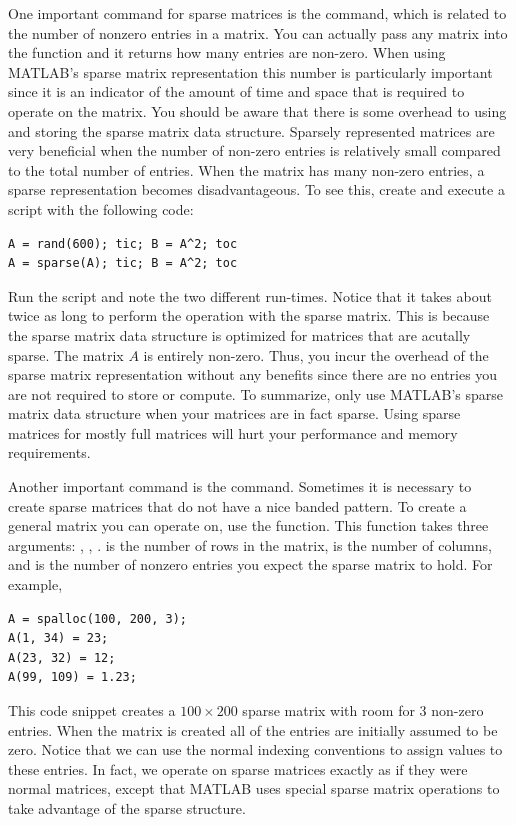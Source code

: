 One important command for sparse matrices is the  command, which is related to the number of nonzero entries in a matrix. You can actually pass any matrix into the  function and it returns how many entries are non-zero. When using MATLAB's sparse matrix representation this number is particularly important since it is an indicator of the amount of time and space that is required to operate on the matrix. You should be aware that there is some overhead to using and storing the sparse matrix data structure. Sparsely represented matrices are very beneficial when the number of non-zero entries is relatively small compared to the total number of entries. When the matrix has many non-zero entries, a sparse representation becomes disadvantageous. To see this, create and execute a script with the following code:

\begin{lstlisting}[style=matlab]
A = rand(600); tic; B = A^2; toc
A = sparse(A); tic; B = A^2; toc
\end{lstlisting}
Run the script and note the two different run-times. Notice that it takes about twice as long to perform the operation with the sparse matrix. This is because the sparse matrix data structure is optimized for matrices that are acutally sparse. The matrix $A$ is entirely non-zero. Thus, you incur the overhead of the sparse matrix representation without any benefits since there are no entries you are not required to store or compute. To summarize, only use MATLAB's sparse matrix data structure when your matrices are in fact sparse. Using sparse matrices for mostly full matrices will hurt your performance and memory requirements.

Another important command is the  command. Sometimes it is necessary to create sparse matrices that do not have a nice banded pattern. To create a general matrix you can operate on, use the  function. This function takes three arguments: , , .  is the number of rows in the matrix,  is the number of columns, and  is the number of nonzero entries you expect the sparse matrix to hold. For example,
\begin{lstlisting}[style=matlab]
A = spalloc(100, 200, 3);
A(1, 34) = 23;
A(23, 32) = 12;
A(99, 109) = 1.23;
\end{lstlisting}
This code snippet creates a $100 \times 200$ sparse matrix with room
for 3 non-zero entries. When the matrix is created all of the entries
are initially assumed to be zero. Notice that we can use the normal
indexing conventions to assign values to these entries. In fact, we
operate on sparse matrices exactly as if they were normal matrices,
except that MATLAB uses special sparse matrix operations to take
advantage of the sparse structure.

